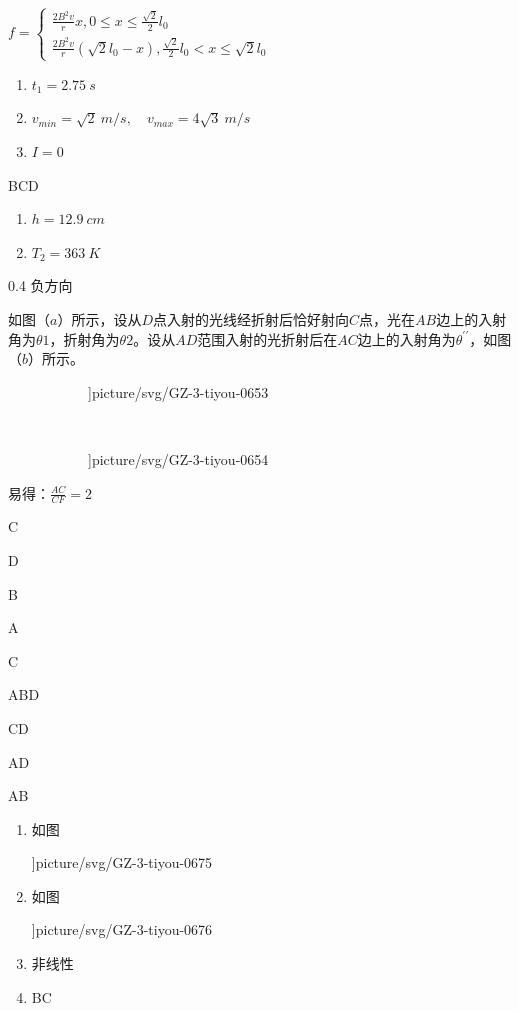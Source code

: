 \item $f=\left \{\begin {array}{l}\frac {2 B^{2} v}{r} x, 0 \leq x \leq \frac {\sqrt {2}}{2} l_{0} \\ \frac {2 B^{2} v}{r}\left (\sqrt {2} l_{0}-x\right ), \frac {\sqrt {2}}{2} l_{0}<x \leq \sqrt {2} l_{0}\end {array}\right .$
\item \begin {enumerate} \item $t_{1}=2.75 \ s$ \item $v_{min}=\sqrt {2} \ m / s, \quad v_{max}=4 \sqrt {3} \ m / s$ \item $I=0$ \end {enumerate}
\item BCD
\item \begin {enumerate} \item $ h=12.9 \ cm $ \item $ T_{2} =363 \ K $ \end {enumerate}
\item 0.4  \quad 负方向
\item 如图（$ a $）所示，设从$ D $点入射的光线经折射后恰好射向$ C $点，光在$ AB $边上的入射角为$ \theta 1 $，折射角为$ \theta 2 $。设从$ AD $范围入射的光折射后在$ AC $边上的入射角为$ \theta ^{\prime \prime } $，如图（$ b $）所示。 \begin {figure}[h!] \centering \begin {subfigure}{1\linewidth } \centering \linewidth ]{picture/svg/GZ-3-tiyou-0653} \caption {}\label {} \end {subfigure} \\ \begin {subfigure}{1\linewidth } \centering \linewidth ]{picture/svg/GZ-3-tiyou-0654} \caption {}\label {} \end {subfigure} \end {figure} 易得：$\frac {A C}{C F}=2$
\item C
\item D
\item B
\item A
\item C
\item ABD
\item CD
\item AD
\item AB
\item \begin {enumerate} \item 如图 \begin {center} \linewidth ]{picture/svg/GZ-3-tiyou-0675} \end {center} \item 如图 \begin {center} \linewidth ]{picture/svg/GZ-3-tiyou-0676} \end {center} \item 非线性 \item BC \end {enumerate}

